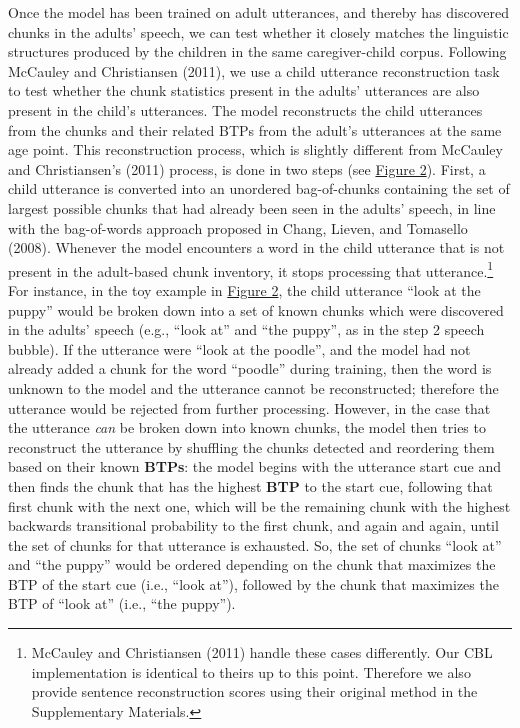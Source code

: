 \documentclass[
  english,
  man,mask,floatsintext]{apa6}
\begin{document}
Once the model has been trained on adult utterances, and thereby has discovered chunks in the adults' speech, we can test whether it closely matches the linguistic structures produced by the children in the same caregiver-child corpus. Following McCauley and Christiansen (2011), we use a child utterance reconstruction task to test whether the chunk statistics present in the adults' utterances are also present in the child's utterances. The model reconstructs the child utterances from the chunks and their related BTPs from the adult's utterances at the same age point. This reconstruction process, which is slightly different from McCauley and Christiansen's (2011) process, is done in two steps (see \protect\hyperlink{fig2}{Figure 2}). First, a child utterance is converted into an unordered bag-of-chunks containing the set of largest possible chunks that had already been seen in the adults' speech, in line with the bag-of-words approach proposed in Chang, Lieven, and Tomasello (2008). Whenever the model encounters a word in the child utterance that is not present in the adult-based chunk inventory, it stops processing that utterance.\footnote{McCauley and Christiansen (2011) handle these cases differently. Our CBL implementation is identical to theirs up to this point. Therefore we also provide sentence reconstruction scores using their original method in the Supplementary Materials.} For instance, in the toy example in \protect\hyperlink{fig2}{Figure 2}, the child utterance \enquote{look at the puppy} would be broken down into a set of known chunks which were discovered in the adults' speech (e.g., \enquote{look at} and \enquote{the puppy}, as in the step 2 speech bubble). If the utterance were \enquote{look at the poodle}, and the model had not already added a chunk for the word \enquote{poodle} during training, then the word is unknown to the model and the utterance cannot be reconstructed; therefore the utterance would be rejected from further processing. However, in the case that the utterance \emph{can} be broken down into known chunks, the model then tries to reconstruct the utterance by shuffling the chunks detected and reordering them based on their known \textbf{BTPs}: the model begins with the utterance start cue and then finds the chunk that has the highest \textbf{BTP} to the start cue, following that first chunk with the next one, which will be the remaining chunk with the highest backwards transitional probability to the first chunk, and again and again, until the set of chunks for that utterance is exhausted. So, the set of chunks \enquote{look at} and \enquote{the puppy} would be ordered depending on the chunk that maximizes the BTP of the start cue (i.e., \enquote{look at}), followed by the chunk that maximizes the BTP of \enquote{look at} (i.e., \enquote{the puppy}).
\end{document}
